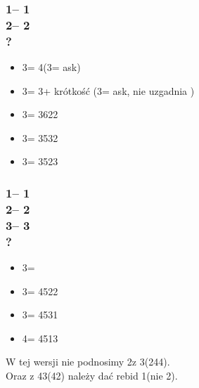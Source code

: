 \documentclass[12pt, a4paper]{report}
\begin{document}
{    \subsubsection*{1\hearts -- 1\spades\\
                    2\spades -- 2\nt\\
                    ?}
    \begin{itemize}
        \item 3\clubs = 4\spades (3\diams = ask)
        \item 3\diams = 3\spades + krótkość (3\hearts = ask, nie uzgadnia \spades)
        \item 3\hearts = 3622
        \item 3\spades = 3532
        \item 3\nt = 3523
    \end{itemize}

    \subsubsection*{1\hearts -- 1\spades\\
                    2\spades -- 2\nt\\
                    3\clubs -- 3\diams\\
                    ?}
    \begin{itemize}
        \item 3\hearts = \bal
        \item 3\spades = 4522
        \item 3\nt = 4531
        \item 4\clubs = 4513
    \end{itemize}

    W tej wersji nie podnosimy 2\spades z 3(244).\\
    Oraz z 43(42) należy dać rebid 1\spades (nie 2\hearts).
}
\end{document}
